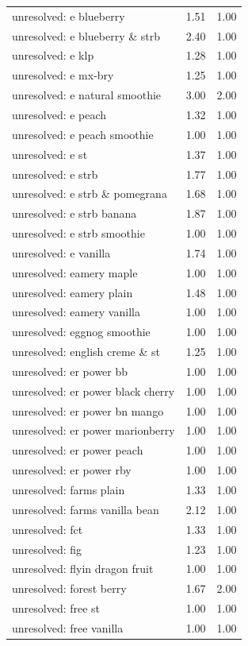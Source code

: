 \begin{table}
\begin{tabular}{lrr}
unresolved: e blueberry & 1.51 & 1.00 \\
unresolved: e blueberry \& strb & 2.40 & 1.00 \\
unresolved: e klp & 1.28 & 1.00 \\
unresolved: e mx-bry & 1.25 & 1.00 \\
unresolved: e natural smoothie & 3.00 & 2.00 \\
unresolved: e peach & 1.32 & 1.00 \\
unresolved: e peach smoothie & 1.00 & 1.00 \\
unresolved: e st & 1.37 & 1.00 \\
unresolved: e strb & 1.77 & 1.00 \\
unresolved: e strb \& pomegrana & 1.68 & 1.00 \\
unresolved: e strb banana & 1.87 & 1.00 \\
unresolved: e strb smoothie & 1.00 & 1.00 \\
unresolved: e vanilla & 1.74 & 1.00 \\
unresolved: eamery maple & 1.00 & 1.00 \\
unresolved: eamery plain & 1.48 & 1.00 \\
unresolved: eamery vanilla & 1.00 & 1.00 \\
unresolved: eggnog smoothie & 1.00 & 1.00 \\
unresolved: english creme \& st & 1.25 & 1.00 \\
unresolved: er power bb & 1.00 & 1.00 \\
unresolved: er power black cherry & 1.00 & 1.00 \\
unresolved: er power bn mango & 1.00 & 1.00 \\
unresolved: er power marionberry & 1.00 & 1.00 \\
unresolved: er power peach & 1.00 & 1.00 \\
unresolved: er power rby & 1.00 & 1.00 \\
unresolved: farms plain & 1.33 & 1.00 \\
unresolved: farms vanilla bean & 2.12 & 1.00 \\
unresolved: fct & 1.33 & 1.00 \\
unresolved: fig & 1.23 & 1.00 \\
unresolved: flyin dragon fruit & 1.00 & 1.00 \\
unresolved: forest berry & 1.67 & 2.00 \\
unresolved: free st & 1.00 & 1.00 \\
unresolved: free vanilla & 1.00 & 1.00 \\

\end{tabular}
\end{table}
